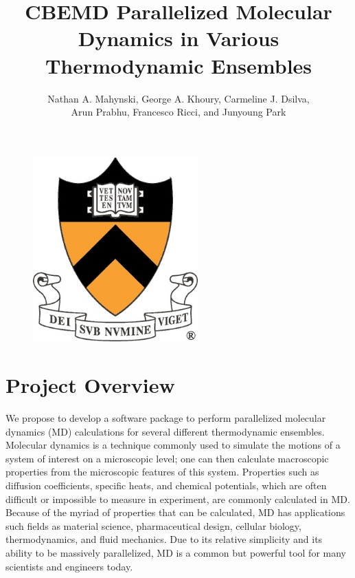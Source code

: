 \documentclass[10pt]{article}
\title{\textbf{CBEMD} Parallelized Molecular Dynamics in Various Thermodynamic Ensembles}
\author{Nathan A. Mahynski, George A. Khoury, Carmeline J. Dsilva, \\
Arun Prabhu, Francesco Ricci, and Junyoung Park}
\date{}
\begin{document}
\maketitle
\begin{figure}[htbp]
   \centering
   \includegraphics[width=2.5in]{princeton.jpg}
\end{figure}
\thispagestyle{empty}
\newpage
\setcounter{page}{1}
\newpage

\section{Project Overview}
We propose to develop a software package to perform parallelized molecular dynamics (MD) calculations for several different thermodynamic ensembles. Molecular dynamics is a technique commonly used to simulate the motions of a system of interest on a microscopic level; one can then calculate macroscopic properties from the microscopic features of this system. Properties such as diffusion coefficients, specific heats, and chemical potentials, which are often difficult or impossible to measure in experiment, are commonly calculated in MD.  Because of the myriad of properties that can be calculated, MD has applications such fields as material science, pharmaceutical design, cellular biology, thermodynamics, and fluid mechanics.  Due to its relative simplicity and its ability to be massively parallelized, MD is a common but powerful tool for many scientists and engineers today.
\end{document}
